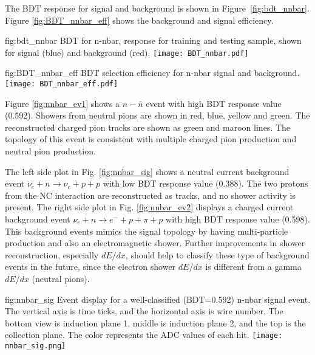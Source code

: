 The BDT response for signal and background is shown in Figure~\ref{fig:bdt_nnbar}. Figure \ref{fig:BDT_nnbar_eff} shows the background and signal efficiency. 

\begin{dunefigure}
{fig:bdt_nnbar}
{BDT for n-nbar, response for training and testing sample, shown for signal (blue) and background (red).}
\texttt{[image: BDT\_nnbar.pdf]}
\end{dunefigure} 

\begin{dunefigure}
{fig:BDT_nnbar_eff}
{BDT selection efficiency for n-nbar signal and background.}
\texttt{[image: BDT\_nnbar\_eff.pdf]}
\end{dunefigure} 

Figure \ref{fig:nnbar_ev1} shows a $n-\bar{n}$ event with high BDT response value (0.592). Showers from neutral pions are shown in red, blue, yellow and green. The reconstructed charged pion tracks are shown as green and maroon lines. The topology of this event is consistent with multiple charged pion production and neutral pion production. 

The left side plot in Fig. \ref{fig:nnbar_sig} shows a neutral current background event $\nu_{e}+n\rightarrow \nu_{e}+p+p$ with low BDT response value (0.388). The two protons from the NC interaction are reconstructed as tracks, and no shower activity is present. The right side plot in Fig. \ref{fig:nnbar_ev2} displays a charged current background event $\nu_{e}+n\rightarrow {e}^{-}+p+\pi +p$ with high BDT response value (0.598). This background events mimics the signal topology by having multi-particle production and also an electromagnetic shower. Further improvements in shower reconstruction, especially $dE/dx$, should help to classify these type of background events in the future, since the electron shower $dE/dx$  is different from a gamma $dE/dx$ (neutral pions).

\begin{dunefigure}
{fig:nnbar_sig}
{Event display for a well-classified (BDT=0.592) n-nbar signal event.  The vertical axis is time ticks, and the horizontal axis is wire number.  The bottom view is induction plane 1, middle is induction plane 2, and the top is the collection plane.  The color represents the ADC values of each hit.}
\texttt{[image: nnbar\_sig.png]}
\end{dunefigure} 

